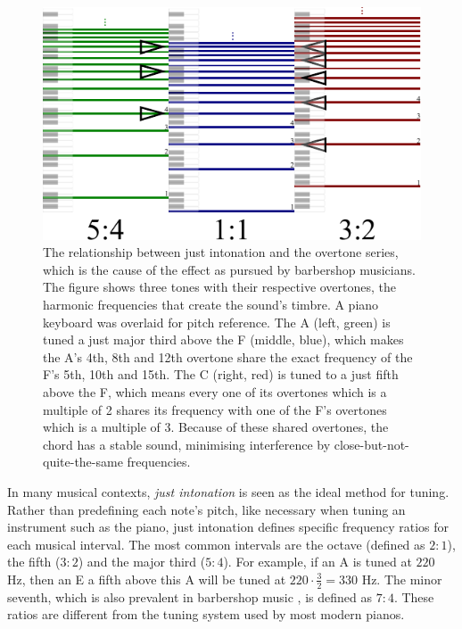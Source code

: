 \documentclass[a4paper]{article}
\begin{document}
\begin{figure}
	\centering
	\includegraphics{Figures/overtones.pdf}
	\caption{The relationship between just intonation and the overtone series, which is the cause of the  effect as pursued by barbershop musicians. The figure shows three tones with their respective overtones, the harmonic frequencies that create the sound's timbre. A piano keyboard was overlaid for pitch reference. The A (left, green) is tuned a just major third above the F (middle, blue), which makes the A's 4th, 8th and 12th overtone share the exact frequency of the F's 5th, 10th and 15th. The C (right, red) is tuned to a just fifth above the F, which means every one of its overtones which is a multiple of 2 shares its frequency with one of the F's overtones which is a multiple of 3. Because of these shared overtones, the chord has a stable sound, minimising interference by close-but-not-quite-the-same frequencies.}
	\label{fig:overtones}
\end{figure}

In many musical contexts, {\it just intonation} is seen as the ideal method for tuning. \cite{boyden_prelleur_1951} Rather than predefining each note's pitch, like necessary when tuning an instrument such as the piano, just intonation defines specific frequency ratios for each musical interval. The most common intervals are the octave (defined as $2:1$), the fifth ($3:2$) and the major third ($5:4$). For example, if an A is tuned at $220$ Hz, then an E a fifth above this A will be tuned at $220 \cdot \frac32 = 330$ Hz. The minor seventh, which is also prevalent in barbershop music \cite{barbershop_harmony_society_contest_2022}, is defined as $7:4$. \cite{van_de_craats_fis_1989} These ratios are different from the tuning system used by most modern pianos.
\end{document}
